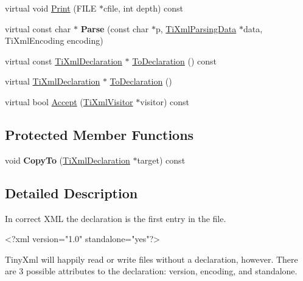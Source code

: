 \begin{DoxyCompactItemize}
\item 
virtual void \hyperlink{class_ti_xml_declaration_abf6303db4bd05b5be554036817ff1cb4}{\-Print} (\-F\-I\-L\-E $\ast$cfile, int depth) const 
\item 
\hypertarget{class_ti_xml_declaration_a9839ea97ed687a2b7342fd7b0f04361b}{
virtual const char $\ast$ {\bfseries \-Parse} (const char $\ast$p, \hyperlink{class_ti_xml_parsing_data}{\-Ti\-Xml\-Parsing\-Data} $\ast$data, \-Ti\-Xml\-Encoding encoding)}
\label{class_ti_xml_declaration_a9839ea97ed687a2b7342fd7b0f04361b}

\item 
virtual const \hyperlink{class_ti_xml_declaration}{\-Ti\-Xml\-Declaration} $\ast$ \hyperlink{class_ti_xml_declaration_a1e085d3fefd1dbf5ccdbff729931a967}{\-To\-Declaration} () const 
\item 
virtual \hyperlink{class_ti_xml_declaration}{\-Ti\-Xml\-Declaration} $\ast$ \hyperlink{class_ti_xml_declaration_a6bd3d1daddcaeb9543c24bfd090969ce}{\-To\-Declaration} ()
\item 
virtual bool \hyperlink{class_ti_xml_declaration_ab6a6b178161ba9abc2c35058de689864}{\-Accept} (\hyperlink{class_ti_xml_visitor}{\-Ti\-Xml\-Visitor} $\ast$visitor) const 
\end{DoxyCompactItemize}
\subsection*{\-Protected \-Member \-Functions}
\begin{DoxyCompactItemize}
\item 
\hypertarget{class_ti_xml_declaration_a9d08959f935421a593032bd3efb30c38}{
void {\bfseries \-Copy\-To} (\hyperlink{class_ti_xml_declaration}{\-Ti\-Xml\-Declaration} $\ast$target) const }
\label{class_ti_xml_declaration_a9d08959f935421a593032bd3efb30c38}

\end{DoxyCompactItemize}


\subsection{\-Detailed \-Description}
\-In correct \-X\-M\-L the declaration is the first entry in the file. \begin{DoxyVerb}
		<?xml version="1.0" standalone="yes"?>
	\end{DoxyVerb}


\-Tiny\-Xml will happily read or write files without a declaration, however. \-There are 3 possible attributes to the declaration\-: version, encoding, and standalone.

